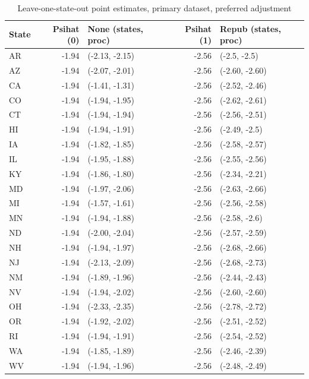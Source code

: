 \documentclass[aoas]{imsart}
\theoremstyle{plain}
\theoremstyle{remark}
\begin{document}
\begin{appendix}
\begin{table}[ht]
\centering
   \caption{Leave-one-state-out point estimates, primary dataset, preferred adjustment}
    \label{tab:loostatec1}
\begin{tabular}{lrlrl}
  \hline
State & Psihat (0) & None (states, proc) & Psihat (1) & Repub (states, proc) \\ 
  \hline
AR & -1.94 & (-2.13, -2.15) & -2.56 & (-2.5, -2.5) \\ 
  AZ & -1.94 & (-2.07, -2.01) & -2.56 & (-2.60, -2.60) \\ 
  CA & -1.94 & (-1.41, -1.31) & -2.56 & (-2.52, -2.46) \\ 
  CO & -1.94 & (-1.94, -1.95) & -2.56 & (-2.62, -2.61) \\ 
  CT & -1.94 & (-1.94, -1.94) & -2.56 & (-2.56, -2.51) \\ 
  HI & -1.94 & (-1.94, -1.91) & -2.56 & (-2.49, -2.5) \\ 
  IA & -1.94 & (-1.82, -1.85) & -2.56 & (-2.58, -2.57) \\ 
  IL & -1.94 & (-1.95, -1.88) & -2.56 & (-2.55, -2.56) \\ 
  KY & -1.94 & (-1.86, -1.80) & -2.56 & (-2.34, -2.21) \\ 
  MD & -1.94 & (-1.97, -2.06) & -2.56 & (-2.63, -2.66) \\ 
  MI & -1.94 & (-1.57, -1.61) & -2.56 & (-2.56, -2.58) \\ 
  MN & -1.94 & (-1.94, -1.88) & -2.56 & (-2.58, -2.6) \\ 
  ND & -1.94 & (-2.00, -2.04) & -2.56 & (-2.57, -2.59) \\ 
  NH & -1.94 & (-1.94, -1.97) & -2.56 & (-2.68, -2.66) \\ 
  NJ & -1.94 & (-2.13, -2.09) & -2.56 & (-2.68, -2.73) \\ 
  NM & -1.94 & (-1.89, -1.96) & -2.56 & (-2.44, -2.43) \\ 
  NV & -1.94 & (-1.94, -2.02) & -2.56 & (-2.60, -2.60) \\ 
  OH & -1.94 & (-2.33, -2.35) & -2.56 & (-2.78, -2.72) \\ 
  OR & -1.94 & (-1.92, -2.02) & -2.56 & (-2.51, -2.52) \\ 
  RI & -1.94 & (-1.94, -1.91) & -2.56 & (-2.54, -2.52) \\ 
  WA & -1.94 & (-1.85, -1.89) & -2.56 & (-2.46, -2.39) \\ 
  WV & -1.94 & (-1.94, -1.96) & -2.56 & (-2.48, -2.49) \\ 
   \hline
\end{tabular}
\end{table}


\end{appendix}
\end{document}
